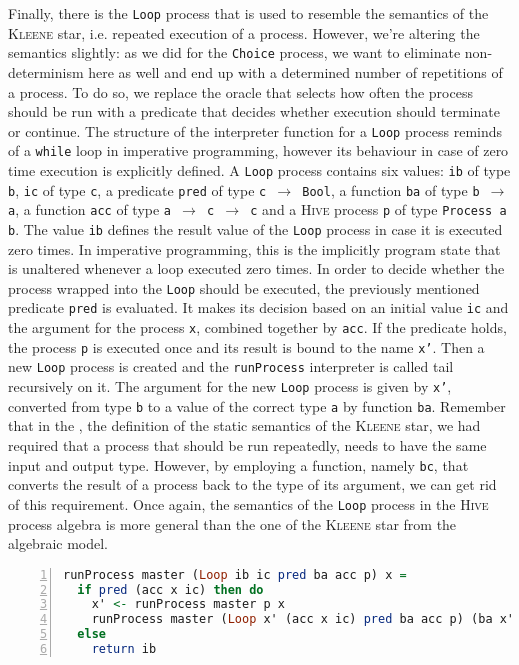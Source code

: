 Finally, there is the \texttt{Loop} process that is used to resemble the semantics of the \textsc{Kleene} star, i.e. repeated execution of a process. However, we're altering the semantics slightly: as we did for the \texttt{Choice} process, we want to eliminate non-determinism here as well and end up with a determined number of repetitions of a process. To do so, we replace the oracle that selects how often the process should be run with a predicate that decides whether execution should terminate or continue. The structure of the interpreter function for a \texttt{Loop} process reminds of a \texttt{while} loop in imperative programming, however its behaviour in case of zero time execution is explicitly defined. A \texttt{Loop} process contains six values: \texttt{ib} of type \texttt{b}, \texttt{ic} of type \texttt{c}, a predicate \texttt{pred} of type \texttt{c $\to$ Bool}, a function \texttt{ba} of type \texttt{b $\to$ a}, a function \texttt{acc} of type \texttt{a $\to$ c $\to$ c} and a \textsc{Hive} process \texttt{p} of type \texttt{Process a b}. The value \texttt{ib} defines the result value of the \texttt{Loop} process in case it is executed zero times. In imperative programming, this is the implicitly program state that is unaltered whenever a loop executed zero times. In order to decide whether the process wrapped into the \texttt{Loop} should be executed, the previously mentioned predicate \texttt{pred} is evaluated. It makes its decision based on an initial value \texttt{ic} and the argument for the process \texttt{x}, combined together by \texttt{acc}. If the predicate holds, the process \texttt{p} is executed once and its result is bound to the name \texttt{x'}. Then a new \texttt{Loop} process is created and the \texttt{runProcess} interpreter is called tail recursively on it. The argument for the new \texttt{Loop} process is given by \texttt{x'}, converted from type \texttt{b} to a value of the correct type \texttt{a} by function \texttt{ba}. Remember that in the , the definition of the static semantics of the \textsc{Kleene} star, we had required that a process that should be run repeatedly, needs to have the same input and output type. However, by employing a function, namely \texttt{bc}, that converts the result of a process back to the type of its argument, we can get rid of this requirement. Once again, the semantics of the \texttt{Loop} process in the \textsc{Hive} process algebra is more general than the one of the \textsc{Kleene} star from the algebraic model.
\begin{lstlisting}[language=Haskell,caption=Implementation of the interpreter for \texttt{Loop} processes.,numbers=left,frame=bt]
runProcess master (Loop ib ic pred ba acc p) x =
  if pred (acc x ic) then do
    x' <- runProcess master p x
    runProcess master (Loop x' (acc x ic) pred ba acc p) (ba x')
  else
    return ib
\end{lstlisting}

